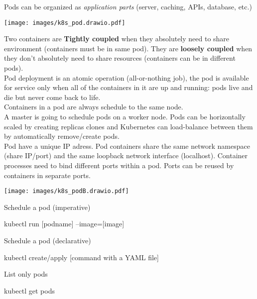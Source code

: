 \documentclass{refcard}
\begin{document}
Pods can be organized as \textit{application parts} (server, caching, APIs, database, etc.)\\

\begin{center}
    \texttt{[image: images/k8s\_pod.drawio.pdf]}
\end{center}

Two containers are \textbf{Tightly coupled} when they absolutely need to share environment (containers must be in same pod). They are \textbf{loosely coupled} when they don't absolutely need to share resources (containers can be in different pods).\\

Pod deployment is an atomic operation (all-or-nothing job), the pod is available for service only when all of the containers in it are up and running: pods live and die but never come back to life.\\

Containers in a pod are always schedule to the same node.\\

A master is going to schedule pods on a worker node. Pods can be horizontally scaled by creating replicas clones and Kubernetes can load-balance between them by automatically remove/create pods.\\

Pod have a unique IP adress. Pod containers share the same network namespace (share IP/port) and the same loopback network interface (localhost). Container processes need to bind different ports within a pod. Ports can be reused by containers in separate ports.

\begin{center}
    \texttt{[image: images/k8s\_podB.drawio.pdf]}
\end{center}

Schedule a pod (imperative)
\begin{ttyenv}
kubectl run [podname] --image=[image]
\end{ttyenv}

Schedule a pod (declarative)
\begin{ttyenv}
kubectl create/apply [command with a YAML file]
\end{ttyenv}

List only pods
\begin{ttyenv}
kubectl get pods
\end{ttyenv}
\end{document}
